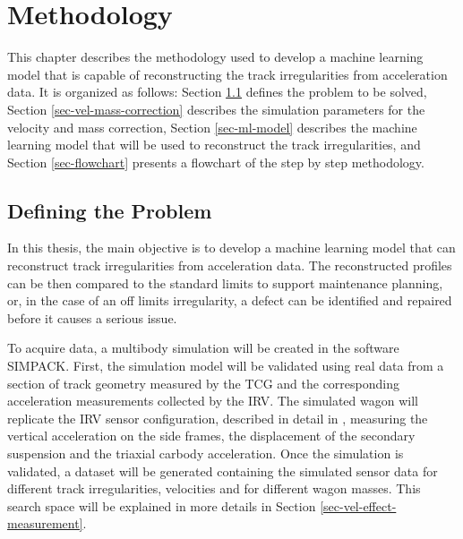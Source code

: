 
\chapter{Methodology} \label{sec-methodology}

This chapter describes the methodology used to develop a machine learning model that is capable of reconstructing the track irregularities from acceleration data. It is organized as follows: Section \ref{sec-defining-problem} defines the problem to be solved, Section \ref{sec-vel-mass-correction} describes the simulation parameters for the velocity and mass correction, Section \ref{sec-ml-model} describes the machine learning model that will be used to reconstruct the track irregularities, and Section \ref{sec-flowchart} presents a flowchart of the step by step methodology.

\section{Defining the Problem} \label{sec-defining-problem}

In this thesis, the main objective is to develop a machine learning model that can reconstruct track irregularities from acceleration data. The reconstructed profiles can be then compared to the standard limits to support maintenance planning, or, in the case of an off limits irregularity, a defect can be identified and repaired before it causes a serious issue.

To acquire data, a multibody simulation will be created in the software SIMPACK. First, the simulation model will be validated using real data from a section of track geometry measured by the TCG and the corresponding acceleration measurements collected by the IRV. The simulated wagon will replicate the IRV sensor configuration, described in detail in \cite{PIRES2024107191}, measuring the vertical acceleration on the side frames, the displacement of the secondary suspension and the triaxial carbody acceleration. Once the simulation is validated, a dataset will be generated containing the simulated sensor data for different track irregularities, velocities and for different wagon masses. This search space will be explained in more details in Section \ref{sec-vel-effect-measurement}.

